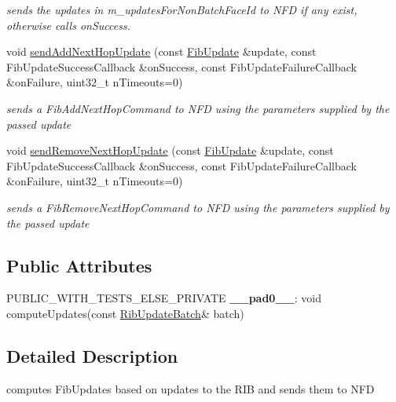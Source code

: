 \begin{DoxyCompactItemize}
\begin{DoxyCompactList}\small\item\em sends the updates in m\+\_\+updates\+For\+Non\+Batch\+Face\+Id to N\+FD if any exist, otherwise calls on\+Success. \end{DoxyCompactList}\item 
void \hyperlink{classnfd_1_1rib_1_1FibUpdater_a0cd91c4e504437bfc2a65f3e2a239555}{send\+Add\+Next\+Hop\+Update} (const \hyperlink{classnfd_1_1rib_1_1FibUpdate}{Fib\+Update} \&update, const Fib\+Update\+Success\+Callback \&on\+Success, const Fib\+Update\+Failure\+Callback \&on\+Failure, uint32\+\_\+t n\+Timeouts=0)
\begin{DoxyCompactList}\small\item\em sends a Fib\+Add\+Next\+Hop\+Command to N\+FD using the parameters supplied by the passed update \end{DoxyCompactList}\item 
void \hyperlink{classnfd_1_1rib_1_1FibUpdater_a19273573c98061b5878254d4e685eaa7}{send\+Remove\+Next\+Hop\+Update} (const \hyperlink{classnfd_1_1rib_1_1FibUpdate}{Fib\+Update} \&update, const Fib\+Update\+Success\+Callback \&on\+Success, const Fib\+Update\+Failure\+Callback \&on\+Failure, uint32\+\_\+t n\+Timeouts=0)
\begin{DoxyCompactList}\small\item\em sends a Fib\+Remove\+Next\+Hop\+Command to N\+FD using the parameters supplied by the passed update \end{DoxyCompactList}\end{DoxyCompactItemize}
\subsection*{Public Attributes}
\begin{DoxyCompactItemize}
\item 
P\+U\+B\+L\+I\+C\+\_\+\+W\+I\+T\+H\+\_\+\+T\+E\+S\+T\+S\+\_\+\+E\+L\+S\+E\+\_\+\+P\+R\+I\+V\+A\+TE {\bfseries \+\_\+\+\_\+pad0\+\_\+\+\_\+}\+: void compute\+Updates(const \hyperlink{classnfd_1_1rib_1_1RibUpdateBatch}{Rib\+Update\+Batch}\& batch)\hypertarget{classnfd_1_1rib_1_1FibUpdater_a54b703a2f4dfeee40d48a676f764f1cc}{}\label{classnfd_1_1rib_1_1FibUpdater_a54b703a2f4dfeee40d48a676f764f1cc}

\end{DoxyCompactItemize}


\subsection{Detailed Description}
computes Fib\+Updates based on updates to the R\+IB and sends them to N\+FD 

